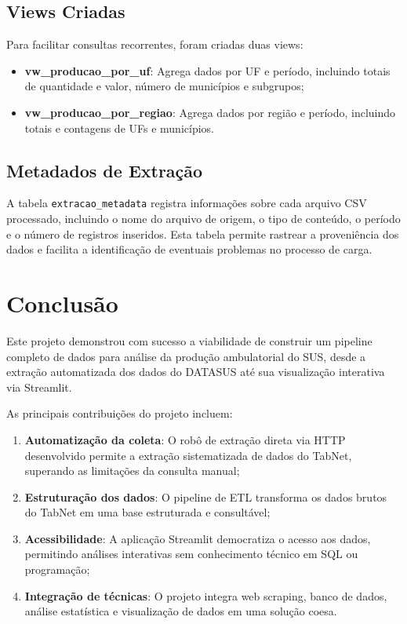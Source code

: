 \documentclass[
    12pt,
    oneside,
    a4paper,
    chapter=TITLE,
    section=TITLE
]{abntex2}
\begin{document}
\section{Views Criadas}

Para facilitar consultas recorrentes, foram criadas duas views:

\begin{itemize}
    \item \textbf{vw\_producao\_por\_uf}: Agrega dados por UF e período, incluindo totais de quantidade e valor, número de municípios e subgrupos;
    \item \textbf{vw\_producao\_por\_regiao}: Agrega dados por região e período, incluindo totais e contagens de UFs e municípios.
\end{itemize}

\section{Metadados de Extração}

A tabela \texttt{extracao\_metadata} registra informações sobre cada arquivo CSV processado, incluindo o nome do arquivo de origem, o tipo de conteúdo, o período e o número de registros inseridos. Esta tabela permite rastrear a proveniência dos dados e facilita a identificação de eventuais problemas no processo de carga.


\chapter{Conclusão}

Este projeto demonstrou com sucesso a viabilidade de construir um pipeline completo de dados para análise da produção ambulatorial do SUS, desde a extração automatizada dos dados do DATASUS até sua visualização interativa via Streamlit.

As principais contribuições do projeto incluem:

\begin{enumerate}
    \item \textbf{Automatização da coleta}: O robô de extração direta via HTTP desenvolvido permite a extração sistematizada de dados do TabNet, superando as limitações da consulta manual;
    \item \textbf{Estruturação dos dados}: O pipeline de ETL transforma os dados brutos do TabNet em uma base estruturada e consultável;
    \item \textbf{Acessibilidade}: A aplicação Streamlit democratiza o acesso aos dados, permitindo análises interativas sem conhecimento técnico em SQL ou programação;
    \item \textbf{Integração de técnicas}: O projeto integra web scraping, banco de dados, análise estatística e visualização de dados em uma solução coesa.
\end{enumerate}
\end{document}
